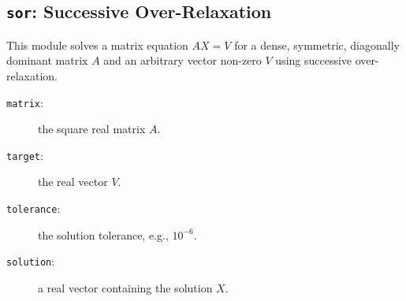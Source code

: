 \subsection{{\tt{sor}}: Successive Over-Relaxation\label{s:toys-sor}}

This module solves a matrix equation $AX=V$
for a dense, symmetric, diagonally dominant matrix $A$
and an arbitrary vector non-zero $V$ using successive over-relaxation.

{}

\begin{description}
\item[{\tt{matrix}}:]
	the square real matrix $A$.
\item[{\tt{target}}:]
	the real vector $V$.
\item[{\tt{tolerance}}:]
	the solution tolerance, e.g., $10^{-6}$.
\end{description}

{\outputspec}

\begin{description}
\item[{\tt{solution}}:]
	a real vector containing the solution $X$.
\end{description}
